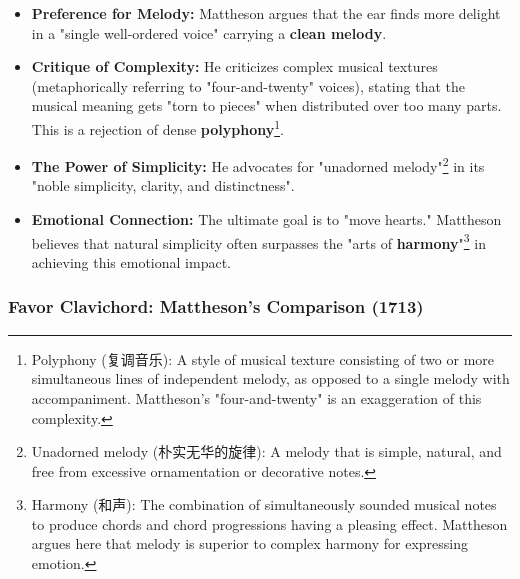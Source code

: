 \documentclass[math,code]{amznotes}
\theoremstyle{remark}
\begin{document}
\begin{itemize}
    \item \textbf{Preference for Melody:} Mattheson argues that the ear finds more delight in a "single well-ordered voice" carrying a \textbf{clean melody}.
    \item \textbf{Critique of Complexity:} He criticizes complex musical textures (metaphorically referring to "four-and-twenty" voices), stating that the musical meaning gets "torn to pieces" when distributed over too many parts. This is a rejection of dense \textbf{polyphony}\footnote{Polyphony (复调音乐): A style of musical texture consisting of two or more simultaneous lines of independent melody, as opposed to a single melody with accompaniment. Mattheson's "four-and-twenty" is an exaggeration of this complexity.}.
    \item \textbf{The Power of Simplicity:} He advocates for "unadorned melody"\footnote{Unadorned melody (朴实无华的旋律): A melody that is simple, natural, and free from excessive ornamentation or decorative notes.} in its "noble simplicity, clarity, and distinctness".
    \item \textbf{Emotional Connection:} The ultimate goal is to "move hearts." Mattheson believes that natural simplicity often surpasses the "arts of \textbf{harmony}"\footnote{Harmony (和声): The combination of simultaneously sounded musical notes to produce chords and chord progressions having a pleasing effect. Mattheson argues here that melody is superior to complex harmony for expressing emotion.} in achieving this emotional impact.
\end{itemize}

\subsubsection{Favor Clavichord: Mattheson's Comparison (1713)}
\end{document}
